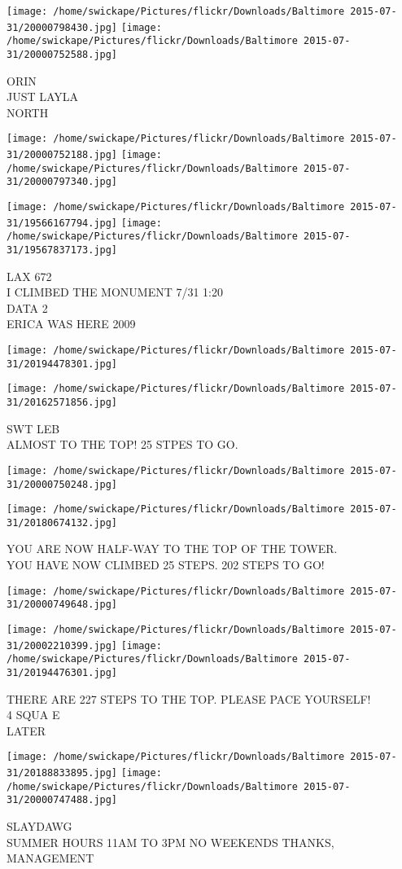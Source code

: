 \documentclass[10pt,letterpaper]{article}
\begin{document}
\vspace{0.25in}
\texttt{[image: /home/swickape/Pictures/flickr/Downloads/Baltimore 2015-07-31/20000798430.jpg]}
\texttt{[image: /home/swickape/Pictures/flickr/Downloads/Baltimore 2015-07-31/20000752588.jpg]}

ORIN\\
JUST LAYLA\\
NORTH
\pagebreak

\texttt{[image: /home/swickape/Pictures/flickr/Downloads/Baltimore 2015-07-31/20000752188.jpg]}
\texttt{[image: /home/swickape/Pictures/flickr/Downloads/Baltimore 2015-07-31/20000797340.jpg]}

\texttt{[image: /home/swickape/Pictures/flickr/Downloads/Baltimore 2015-07-31/19566167794.jpg]}
\texttt{[image: /home/swickape/Pictures/flickr/Downloads/Baltimore 2015-07-31/19567837173.jpg]}

LAX 672\\
I CLIMBED THE MONUMENT 7/31 1:20\\
DATA 2\\
ERICA WAS HERE 2009
\pagebreak

\texttt{[image: /home/swickape/Pictures/flickr/Downloads/Baltimore 2015-07-31/20194478301.jpg]}

\vspace{0.25in}
\texttt{[image: /home/swickape/Pictures/flickr/Downloads/Baltimore 2015-07-31/20162571856.jpg]}

SWT LEB\\
ALMOST TO THE TOP!  25 STPES TO GO.
\pagebreak

\texttt{[image: /home/swickape/Pictures/flickr/Downloads/Baltimore 2015-07-31/20000750248.jpg]}

\vspace{0.25in}
\texttt{[image: /home/swickape/Pictures/flickr/Downloads/Baltimore 2015-07-31/20180674132.jpg]}

YOU ARE NOW HALF{-}WAY TO THE TOP OF THE TOWER.\\
YOU HAVE NOW CLIMBED 25 STEPS.  202 STEPS TO GO!
\pagebreak

\texttt{[image: /home/swickape/Pictures/flickr/Downloads/Baltimore 2015-07-31/20000749648.jpg]}

\vspace{0.25in}
\texttt{[image: /home/swickape/Pictures/flickr/Downloads/Baltimore 2015-07-31/20002210399.jpg]}
\texttt{[image: /home/swickape/Pictures/flickr/Downloads/Baltimore 2015-07-31/20194476301.jpg]}

THERE ARE 227 STEPS TO THE TOP.  PLEASE PACE YOURSELF!\\
4 SQUA E\\
LATER
\pagebreak

\texttt{[image: /home/swickape/Pictures/flickr/Downloads/Baltimore 2015-07-31/20188833895.jpg]}
\texttt{[image: /home/swickape/Pictures/flickr/Downloads/Baltimore 2015-07-31/20000747488.jpg]}

SLAYDAWG\\
SUMMER HOURS 11AM TO 3PM NO WEEKENDS THANKS, MANAGEMENT
\pagebreak
\end{document}
